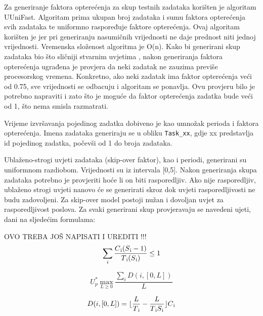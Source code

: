 \documentclass[../zavrsni.tex]{subfiles}
\begin{document}
Za generiranje faktora opterećenja za skup testnih zadataka korišten je algoritam UUniFast. Algoritam prima ukupan broj zadataka 
i sumu faktora opterećenja svih zadataka te uniformno raspoređuje faktore opterećenja. Ovaj algoritam korišten je jer pri generiranju nasumičnih
vrijednosti ne daje prednost niti jednoj vrijednosti. Vremenska složenost algoritma je O(n). Kako bi generirani skup zadataka bio što sličniji stvarnim uvjetima
, nakon generiranja faktora opterećenja ugrađena je provjera da neki zadatak ne zauzima previše procesorskog vremena. Konkretno, ako neki zadatak ima faktor
opterećenja veći od 0.75, sve vrijednosti se odbacuju i algoritam se ponavlja. Ovu provjeru bilo je potrebno napraviti i zato što je moguće da faktor
opterećenja zadatka bude veći od 1, što nema smisla razmatrati.

Vrijeme izvršavanja pojedinog zadatka dobiveno je kao umnožak perioda i faktora opterećenja.
Imena zadataka generiraju se u obliku \texttt{Task\_xx}, gdje xx predstavlja id pojedinog zadatka, počevši od 1 do broja zadataka.

Ublaženo-strogi uvjeti zadataka (skip-over faktor), kao i periodi, generirani su uniformnom razdiobom. Vrijednosti su iz intervala [0,5].
Nakon generiranja skupa zadataka potrebno je provjeriti hoće li on biti rasporedljiv. Ako nije rasporedljiv, ublaženo strogi uvjeti nanovo 
će se generirati skroz dok uvjeti rasporedljivosti ne budu zadovoljeni. Za skip-over model postoji nužan i dovoljan uvjet za rasporedljivost 
poslova. Za svaki generirani skup provjeravaju se navedeni ujeti, dani na sljedećim formulama: 

OVO TREBA JOŠ NAPISATI I UREDITI !!!
\begin{equation*}
    \sum_{i}\frac{C\textsubscript{i}(S\textsubscript{i}-1)}{T\textsubscript{i}(S\textsubscript{i})} \le 1
\end{equation*}

\begin{equation*}
    U_{p}^{*} \max_{L\geq0}\frac{\sum_{i}D(i,[0,L])}{L}
\end{equation*}


\begin{equation*}
    D(i,[0,L])=\lfloor \frac{L}{T\textsubscript{i}}-\frac{L}{T\textsubscript{i}S\textsubscript{i}} \rfloor C\textsubscript{i}
\end{equation*}
\end{document}
